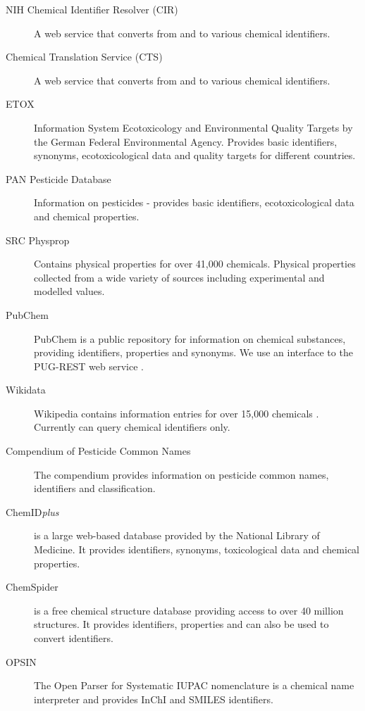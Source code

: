 \documentclass[article, shortnames]{jss}\usepackage[]{graphicx}\usepackage[]{color}
\begin{document}
\begin{description}
  \item[NIH Chemical Identifier Resolver (CIR) \citep{cir}]{A web service that converts from and to various chemical identifiers.}
  \item[Chemical Translation Service (CTS) \citep{Wohlgemuth_Haldiya_Willighagen_Kind_Fiehn_2010}]{A web service that converts from and to various chemical identifiers.}
  \item[ETOX \citep{etox}]{Information System Ecotoxicology and Environmental Quality Targets by the German Federal Environmental Agency. Provides basic identifiers, synonyms, ecotoxicological data and quality targets for different countries.}
  \item[PAN Pesticide Database \citep{pan}]{Information on pesticides - provides basic identifiers, ecotoxicological data and chemical properties.}
  \item[SRC Physprop \citep{physprop}]{Contains physical properties for over 41,000 chemicals.
  Physical properties collected from a wide variety of sources including experimental and modelled values.}
  \item[PubChem \citep{Kim_2016}]{PubChem is a public repository for information on chemical substances, providing identifiers, properties and synonyms.
  We use an interface to the PUG-REST web service \citep{Kim_Thiessen_Bolton_Bryant_2015}.}
  \item[Wikidata \citep{wiki}]{Wikipedia contains information entries for over 15,000 chemicals \citep{Ertl_Patiny_Sander_Rufener_Zasso_2015}. Currently  can query chemical identifiers only.}
  \item[Compendium of Pesticide Common Names \citep{wood}]{The compendium provides information on pesticide common names, identifiers and classification.}
  \item[ChemID\emph{plus} \citep{Tomasulo_2002}]{is a large web-based database provided by the National Library of Medicine. It provides identifiers, synonyms, toxicological data and chemical properties.}
  \item[ChemSpider \citep{pence_chemspider:_2010}]{is a free chemical structure database providing access to over 40 million structures. It provides identifiers, properties and can also be used to convert identifiers.}
  \item[OPSIN  \citep{Lowe_Corbett_Murray-Rust_Glen_2011}]{The Open Parser for Systematic IUPAC nomenclature is a chemical name interpreter and provides InChI and SMILES identifiers.}
\end{description}
\end{document}
